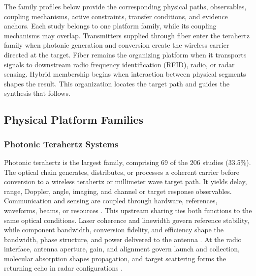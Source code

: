 The family profiles below provide the corresponding physical paths,
observables, coupling mechanisms, active constraints, transfer conditions, and
evidence anchors. Each study belongs to one platform family, while its coupling
mechanisms may overlap. Transmitters supplied through fiber enter the terahertz
family when photonic generation and conversion create the wireless carrier
directed at the target. Fiber remains the organizing platform when it transports
signals to downstream radio frequency identification (RFID), radio, or radar
sensing. Hybrid membership begins when interaction between physical segments
shapes the result. This organization locates the target path and guides the
synthesis that follows.

\subsection{Physical Platform Families}

\subsubsection{Photonic Terahertz Systems}

Photonic terahertz is the largest family, comprising 69 of the 206
studies (33.5\%). The optical chain generates, distributes, or processes a
coherent carrier before conversion to a wireless terahertz or millimeter wave
target path. It yields delay, range, Doppler, angle, imaging, and channel or
target response observables. Communication and sensing are coupled through
hardware, references, waveforms, beams, or resources
\cite{OISAC_SCR01054,OISAC_SCR00036,OISAC_SCR00083}. This upstream sharing ties
both functions to the same optical conditions. Laser coherence and linewidth
govern reference stability, while component bandwidth, conversion fidelity,
and efficiency shape the bandwidth, phase structure, and power delivered to
the antenna \cite{OISAC_SCR00988,OISAC_SCR01004}. At the radio interface,
antenna aperture, gain, and alignment govern launch and collection, molecular
absorption shapes propagation, and target scattering forms the returning echo
in radar configurations \cite{OISAC_SCR00989,OISAC_SCR00992}.

